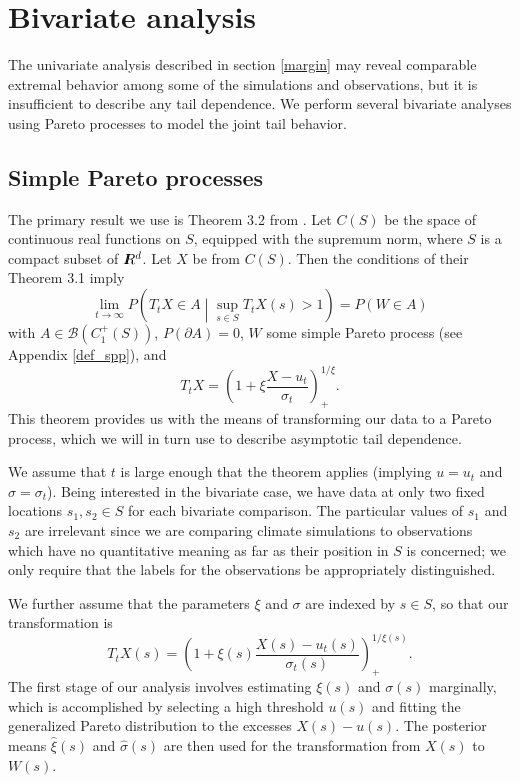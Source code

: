 \section{Bivariate analysis}
\label{bivariate}


The univariate analysis described in section \ref{margin} may reveal comparable extremal behavior among some of the simulations and observations, but it is insufficient to describe any tail dependence. We perform several bivariate analyses using Pareto processes to model the joint tail behavior.

\subsection{Simple Pareto processes}
\label{simp_par}

The primary result we use is Theorem 3.2 from \cite{ferreira2014generalized}. Let $C(S)$ be the space of continuous real functions on $S$, equipped with the supremum norm, where $S$ is a compact subset of $I\hspace{-4.4pt}R^d$. Let $X$ be from $C(S)$. Then the conditions of their Theorem 3.1 imply
\[ \lim_{t\rightarrow\infty} P\left(T_t X \in A \middle| \sup_{s\in S} T_t X(s) > 1\right) = P(W \in A) \]
with $A \in \mathcal{B}(C_1^+(S))$, $P(\partial A)=0$, $W$ some simple Pareto process (see Appendix \ref{def_spp}), and
\[ T_t X = \left(1 + \xi \frac{X - u_t}{\sigma_t}\right)_+^{1/\xi}. \]
This theorem provides us with the means of transforming our data to a Pareto process, which we will in turn use to describe asymptotic tail dependence.

We assume that $t$ is large enough that the theorem applies (implying $u=u_t$ and $\sigma=\sigma_t$). Being interested in the bivariate case, we have data at only two fixed locations $s_1,s_2\in S$ for each bivariate comparison. The particular values of $s_1$ and $s_2$ are irrelevant since we are comparing climate simulations to observations which have no quantitative meaning as far as their position in $S$ is concerned; we only require that the labels for the observations be appropriately distinguished.

We further assume that the parameters $\xi$ and $\sigma$ are indexed by $s\in S$, so that our transformation is
\[ T_t X(s) = \left(1 + \xi(s) \frac{X(s) - u_t(s)}{\sigma_t(s)}\right)_+^{1/\xi(s)}. \]
The first stage of our analysis involves estimating $\xi(s)$ and $\sigma(s)$ marginally, which is accomplished by selecting a high threshold $u(s)$ and fitting the generalized Pareto distribution to the excesses $X(s)-u(s)$. The posterior means $\hat{\xi}(s)$ and $\hat{\sigma}(s)$ are then used for the transformation from $X(s)$ to $W(s)$.

